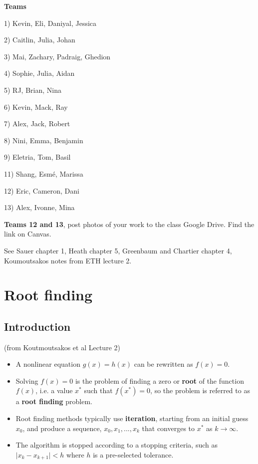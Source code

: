 \documentclass[12pt,letterpaper,noanswers]{exam}
\begin{document}
\noindent \textbf{Teams}

\begin{multicols}{3}
1) Kevin, Eli, Daniyal, Jessica

2) Caitlin, Julia, Johan

3) Mai, Zachary, Padraig, Ghedion

4) Sophie, Julia, Aidan

5) RJ, Brian, Nina

6) Kevin, Mack, Ray

7) Alex, Jack, Robert

8) Nini, Emma, Benjamin

9) Eletria, Tom, Basil

11) Shang, Esmé, Marissa

12) Eric, Cameron, Dani

13) Alex, Ivonne, Mina
\end{multicols}

\textbf{Teams 12 and 13}, post photos of your work to the class Google Drive.  Find the link on Canvas.

\noindent See Sauer chapter 1, Heath chapter 5, Greenbaum and Chartier chapter 4, Koumoutsakos notes from ETH lecture 2.



\section*{Root finding}
\subsection*{Introduction}


\begin{tcolorbox}
(from Koutmoutsakos et al Lecture 2)

\begin{itemize}
\itemsep0pt
    \item A nonlinear equation $g(x) = h(x)$ can be rewritten as $f(x) = 0$.
    \item Solving $f(x) = 0$ is the problem of finding a zero or \textbf{root} of the function $f(x)$, i.e. a value $x^*$ such that $f(x^*) = 0$, so the problem is referred to as a \textbf{root finding} problem.
\end{itemize}
\end{tcolorbox}

\begin{tcolorbox}
\begin{itemize}
\itemsep0pt
    \item Root finding methods typically use \textbf{iteration}, starting from an initial guess $x_0$, and produce a sequence, $x_0, x_1, ..., x_k$ that converges to $x^*$ as $k\rightarrow \infty$.
    \item The algorithm is stopped according to a stopping criteria, such as $\vert x_k - x_{k+1}\vert < h$ where $h$ is a pre-selected tolerance.
\end{itemize}
\end{tcolorbox}
\end{document}
